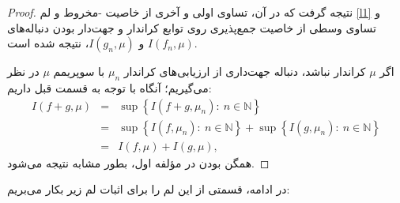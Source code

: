 \documentclass[12pt,a4paper]{article}
\theoremstyle{definition}
\theoremstyle{theorem}
\theoremstyle{definition}
\begin{document}
\begin{proof}
نتیجه گرفت که در آن، تساوی اولی و آخری از خاصیت -مخروط
  و لم 
\ref{l1} و تساوی وسطی از خاصیت جمع‌پذیری روی توابع کراندار و جهت‌دار بودن دنباله‌های 
$ I(f_{n},\mu) $ 
و 
$I(g_{n},\mu)  $، نتیجه شده است.

اگر $ \mu $ کراندار نباشد، دنباله جهت‌داری از ارزیابی‌های کراندار $ \mu_{n} $ با سوپریمم $ \mu $ 
در نظر می‌گیریم؛  آنگاه با توجه به قسمت قبل
داریم:
\begin{eqnarray*}
I(f+g,\mu)&=&\sup\left\lbrace I(f+g,\mu_{n}): \ n\in \mathbb{N}\right\rbrace \\
&=&\sup\left\lbrace I(f,\mu_{n}): \  n\in \mathbb{N}\right\rbrace+\sup\left\lbrace I(g,\mu_{n}): \  n\in \mathbb{N}\right\rbrace\\
&=&I(f,\mu)+I(g,\mu),
\end{eqnarray*}
همگن بودن در مؤلفه اول،  بطور مشابه نتیجه می‌شود.
\end{proof}
در ادامه، قسمتی از این لم را برای اثبات لم زیر بکار می‌بریم:
\end{document}
